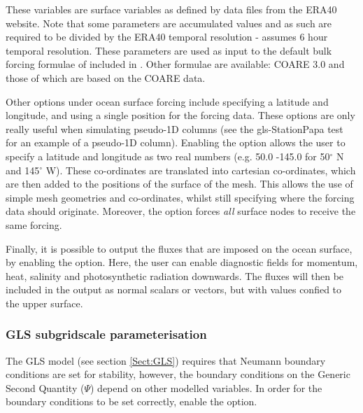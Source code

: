 These variables are surface variables as defined by data files from the ERA40 website. Note that some parameters are accumulated values
and as such are required to be divided by the ERA40 temporal resolution - \fluidity { } assumes 6 hour temporal resolution. 
These parameters are used as input to the default bulk forcing formulae of \citet{large2004} included in \fluidity. Other
formulae are available: COARE 3.0 \citep{fairall2003} and those of \citet{kara2005} which are based on the COARE data.

Other options under ocean surface forcing include specifying a latitude and longitude, and using a single position for the
forcing data. These options are only really useful when simulating pseudo-1D columns (see the gls-StationPapa test for an example
of a pseudo-1D column). Enabling the  option allows the user to specify a latitude and longitude as
two real numbers (e.g. 50.0 -145.0 for 50$^\circ$ N and 145$^\circ$ W). These co-ordinates are translated into cartesian
co-ordinates, which are then added to the positions of the surface of the mesh. This allows the use of simple mesh geometries
and co-ordinates, whilst still specifying where the forcing data should originate. Moreover, the 
option forces \emph{all} surface nodes to receive the same forcing.

Finally, it is possible to output the fluxes that are imposed on the ocean surface, by enabling the
 option. Here, the user can enable diagnostic fields for momentum, heat, salinity and
photosynthetic radiation downwards. The fluxes will then be included in the output as normal scalars or vectors, but with values
confied to the upper surface.

\subsubsection{GLS subgridscale parameterisation}\label{Sect:BCs:special:gls}

The GLS model (see section \ref{Sect:GLS}) requires that Neumann boundary
conditions are set for stability, however, the boundary conditions on the
Generic Second Quantity ($\Psi$) depend on other modelled variables. In
order for the boundary conditions to be set correctly, enable the \linebreak
{}
option.


